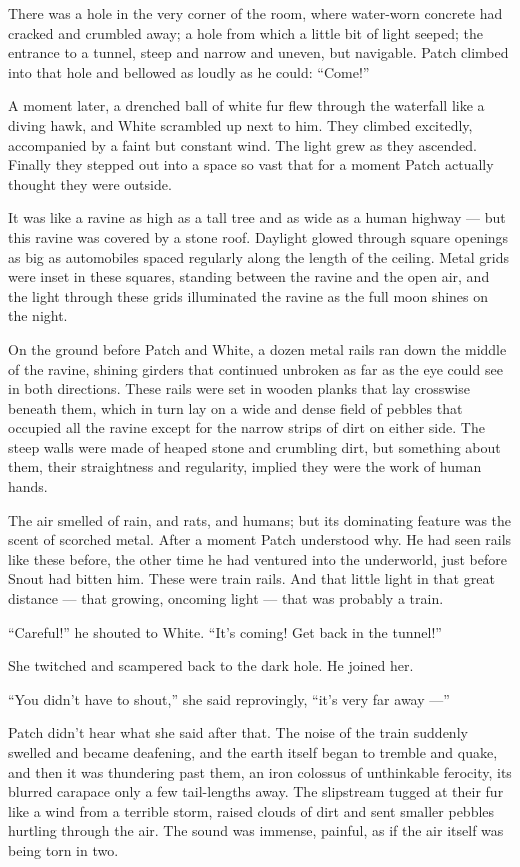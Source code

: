\documentclass[12pt]{memoir}
\begin{document}
There was a hole in the very corner of the room, where water-worn
concrete had cracked and crumbled away; a hole from which a little bit
of light seeped; the entrance to a tunnel, steep and narrow and
uneven, but navigable. Patch climbed into that hole and bellowed as
loudly as he could: “Come!”

A moment later, a drenched ball of white fur flew through the
waterfall like a diving hawk, and White scrambled up next to him. They
climbed excitedly, accompanied by a faint but constant wind. The light
grew as they ascended. Finally they stepped out into a space so vast
that for a moment Patch actually thought they were outside.

It was like a ravine as high as a tall tree and as wide as a human
highway — but this ravine was covered by a stone roof. Daylight glowed
through square openings as big as automobiles spaced regularly along
the length of the ceiling. Metal grids were inset in these squares,
standing between the ravine and the open air, and the light through
these grids illuminated the ravine as the full moon shines on the
night.

On the ground before Patch and White, a dozen metal rails ran down the
middle of the ravine, shining girders that continued unbroken as far
as the eye could see in both directions. These rails were set in
wooden planks that lay crosswise beneath them, which in turn lay on a
wide and dense field of pebbles that occupied all the ravine except
for the narrow strips of dirt on either side. The steep walls were
made of heaped stone and crumbling dirt, but something about them,
their straightness and regularity, implied they were the work of human
hands.

The air smelled of rain, and rats, and humans; but its dominating
feature was the scent of scorched metal. After a moment Patch
understood why. He had seen rails like these before, the other time he
had ventured into the underworld, just before Snout had bitten
him. These were train rails. And that little light in that great
distance — that growing, oncoming light — that was probably a train.

“Careful!” he shouted to White. “It’s coming! Get back in the tunnel!”

She twitched and scampered back to the dark hole. He joined her.

“You didn’t have to shout,” she said reprovingly, “it’s very far away
—”

Patch didn’t hear what she said after that. The noise of the train
suddenly swelled and became deafening, and the earth itself began to
tremble and quake, and then it was thundering past them, an iron
colossus of unthinkable ferocity, its blurred carapace only a few
tail-lengths away. The slipstream tugged at their fur like a wind from
a terrible storm, raised clouds of dirt and sent smaller pebbles
hurtling through the air. The sound was immense, painful, as if the
air itself was being torn in two.
\end{document}
